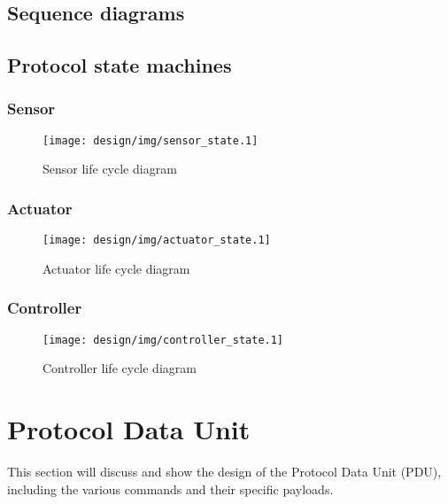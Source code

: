 \subsection{Sequence diagrams} %
\label{sub:message_passing}

\subsection{Protocol state machines} %
\label{sub:states}

\subsubsection{Sensor} %
\label{ssub:sensor}
\begin{figure}[h!]
\centering
\texttt{[image: design/img/sensor\_state.1]}
\caption{Sensor life cycle diagram}
\label{fig:sensorstate}
\end{figure}
\subsubsection{Actuator} %
\label{ssub:actuator}
\begin{figure}[h!]
\centering
\texttt{[image: design/img/actuator\_state.1]}
\caption{Actuator life cycle diagram}
\label{fig:controllerstate}
\end{figure}

\subsubsection{Controller} %
\label{ssub:controller}
\begin{figure}[h!]
\centering
\texttt{[image: design/img/controller\_state.1]}
\caption{Controller life cycle diagram}
\label{fig:controllerstate}
\end{figure}







\newpage
\section{Protocol Data Unit} %
\label{sub:protocol_data_unit}
This section will discuss and show the design of the Protocol Data Unit (PDU), including the various commands and their specific payloads. 


